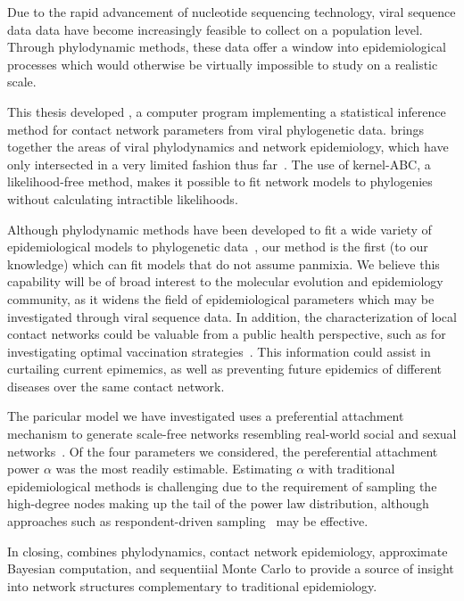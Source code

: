 Due to the rapid advancement of nucleotide sequencing technology, viral
sequence data data have become increasingly feasible to collect on a population
level. Through phylodynamic methods, these data offer a window into
epidemiological processes which would otherwise be virtually impossible to
study on a realistic scale. 

This thesis developed , a computer program implementing a
statistical inference method for contact network parameters from viral
phylogenetic data.  brings together the areas of viral
phylodynamics and network epidemiology, which have only intersected in a very
limited fashion thus far~\autocite{welch2011statistical}. The use of
kernel-\gls{ABC}, a likelihood-free method, makes it possible to fit network
models to phylogenies without calculating intractible likelihoods.

Although phylodynamic methods have been developed to fit a wide variety of
epidemiological models to phylogenetic data~\autocite{volz2012complex,
rasmussen2014phylodynamic}, our method is the first (to our knowledge) which
can fit models that do not assume panmixia. We believe this capability will be
of broad interest to the molecular evolution and epidemiology community, as it
widens the field of epidemiological parameters which may be investigated
through viral sequence data. In addition, the characterization of local contact
networks could be valuable from a public health perspective, such as for
investigating optimal vaccination strategies~\autocite{keeling2005networks,
peng2013vaccination, ma2013importance, rushmore2014network}. This information
could assist in curtailing current epimemics, as well as preventing future
epidemics of different diseases over the same contact network.

The paricular model we have investigated uses a preferential attachment
mechanism to generate scale-free networks resembling real-world social and
sexual networks~\autocite{liljeros2001web, schneeberger2004scale,
colgate1989risk}. Of the four parameters we considered, the pereferential
attachment power $\alpha$ was the most readily estimable. Estimating $\alpha$
with traditional epidemiological methods is challenging due to the requirement
of sampling the high-degree nodes making up the tail of the power law
distribution, although approaches such as respondent-driven
sampling~\autocite{heckathorn1997respondent} may be effective. 

In closing,  combines phylodynamics, contact network
epidemiology, approximate Bayesian computation, and sequentiial Monte Carlo 
to provide a source of insight into network structures complementary to
traditional epidemiology.
